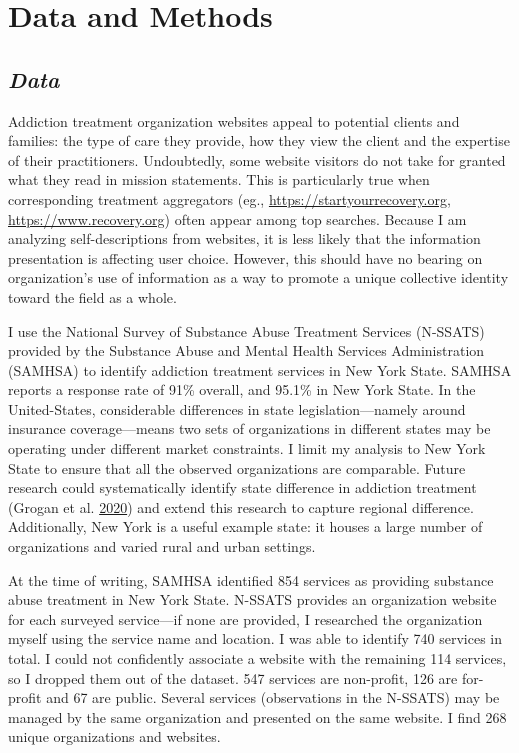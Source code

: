 \documentclass[
  12pt,
]{article}
\begin{document}
\hypertarget{data-and-methods}{%
\section{Data and Methods}\label{data-and-methods}}

\hypertarget{data}{%
\subsection{\texorpdfstring{\emph{Data}}{Data}}\label{data}}

Addiction treatment organization websites appeal to potential clients and families: the type of care they provide, how they view the client and the expertise of their practitioners. Undoubtedly, some website visitors do not take for granted what they read in mission statements. This is particularly true when corresponding treatment aggregators (eg., \url{https://startyourrecovery.org}, \url{https://www.recovery.org}) often appear among top searches. Because I am analyzing self-descriptions from websites, it is less likely that the information presentation is affecting user choice. However, this should have no bearing on organization's use of information as a way to promote a unique collective identity toward the field as a whole.

\vspace{12pt}

I use the National Survey of Substance Abuse Treatment Services (N-SSATS) provided by the Substance Abuse and Mental Health Services Administration (SAMHSA) to identify addiction treatment services in New York State. SAMHSA reports a response rate of 91\% overall, and 95.1\% in New York State. In the United-States, considerable differences in state legislation---namely around insurance coverage---means two sets of organizations in different states may be operating under different market constraints. I limit my analysis to New York State to ensure that all the observed organizations are comparable. Future research could systematically identify state difference in addiction treatment (Grogan et al. \protect\hyperlink{ref-grogan2020}{2020}) and extend this research to capture regional difference. Additionally, New York is a useful example state: it houses a large number of organizations and varied rural and urban settings.

\vspace{12pt}

At the time of writing, SAMHSA identified 854 services as providing substance abuse treatment in New York State. N-SSATS provides an organization website for each surveyed service---if none are provided, I researched the organization myself using the service name and location. I was able to identify 740 services in total. I could not confidently associate a website with the remaining 114 services, so I dropped them out of the dataset. 547 services are non-profit, 126 are for-profit and 67 are public. Several services (observations in the N-SSATS) may be managed by the same organization and presented on the same website. I find 268 unique organizations and websites.
\end{document}
